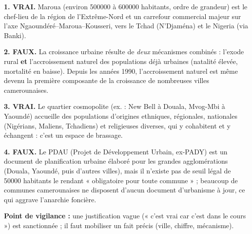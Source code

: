 \documentclass[11pt]{article}
\begin{document}
\begin{corrige}
\textbf{1. VRAI.} Maroua (environ \num{500 000} à \num{600 000} habitants, ordre de grandeur) est le chef-lieu de la région de l'Extrême-Nord et un carrefour commercial majeur sur l'axe Ngaoundéré–Maroua–Kousseri, vers le Tchad (N'Djaména) et le Nigeria (via Banki).

\textbf{2. FAUX.} La croissance urbaine résulte de \emph{deux} mécanismes combinés : l'exode rural \textbf{et} l'accroissement naturel des populations déjà urbaines (natalité élevée, mortalité en baisse). Depuis les années 1990, l'accroissement naturel est même devenu la première composante de la croissance de nombreuses villes camerounaises.

\textbf{3. VRAI.} Le quartier cosmopolite (ex. : New Bell à Douala, Mvog-Mbi à Yaoundé) accueille des populations d'origines ethniques, régionales, nationales (Nigérians, Maliens, Tchadiens) et religieuses diverses, qui y cohabitent et y échangent : c'est un espace de brassage.

\textbf{4. FAUX.} Le PDAU (Projet de Développement Urbain, ex-PADY) est un document de planification urbaine élaboré pour les grandes agglomérations (Douala, Yaoundé, puis d'autres villes), mais il n'existe pas de seuil légal de \num{50 000} habitants le rendant « obligatoire pour toute commune » ; beaucoup de communes camerounaises ne disposent d'aucun document d'urbanisme à jour, ce qui aggrave l'anarchie foncière.

\textbf{Point de vigilance :} une justification vague (« c'est vrai car c'est dans le cours ») est sanctionnée ; il faut mobiliser un fait précis (ville, chiffre, mécanisme).
\end{corrige}
\end{document}

